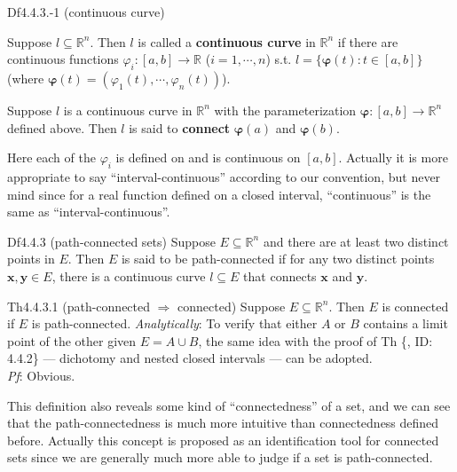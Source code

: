 \documentclass{article}
\begin{document}
\begin{Df}{Df4.4.3.-1 (continuous curve)}
    \begin{compactenum}
        \item Suppose $l\subseteq\mathbb{R}^n$. Then $l$ is called a \textbf{continuous curve} in $\mathbb{R}^n$ if there are continuous functions $\varphi_i: [a,b]\rightarrow\mathbb{R}$ ($i = 1, \cdots, n$) s.t. $l = \{\pmb{\varphi}(t): t\in [a,b]\}$ (where $\pmb{\varphi}(t) = (\varphi_1(t), \cdots, \varphi_n(t))$).
        \item Suppose $l$ is a continuous curve in $\mathbb{R}^n$ with the parameterization $\pmb{\varphi}: [a,b]\rightarrow\mathbb{R}^n$ defined above. Then $l$ is said to \textbf{connect} $\pmb{\varphi}(a)$ and $\pmb{\varphi}(b)$.
    \end{compactenum}
\end{Df}

\begin{Rmk}{}
    Here each of the $\varphi_i$ is defined on and is continuous on $[a,b]$. Actually it is more appropriate to say ``interval-continuous'' according to our convention, but never mind since for a real function defined on a closed interval, ``continuous'' is the same as ``interval-continuous''.
\end{Rmk}

\begin{Df}{Df4.4.3 (path-connected sets)}
    Suppose $E\subseteq\mathbb{R}^n$ and there are at least two distinct points in $E$. Then $E$ is said to be path-connected if for any two distinct points $\pmb{x}, \pmb{y}\in E$, there is a continuous curve $l\subseteq E$ that connects $\pmb{x}$ and $\pmb{y}$.
\end{Df}

\begin{Th}{Th4.4.3.1 (path-connected $\Rightarrow$ connected)}
    Suppose $E\subseteq\mathbb{R}^n$. Then $E$ is connected if $E$ is path-connected.
    \tcblower
    \textcolor{P}{\textit{Analytically}: To verify that either $A$ or $B$ contains a limit point of the other given $E = A\cup B$, the same idea with the proof of Th \{, ID: 4.4.2\} — dichotomy and nested closed intervals — can be adopted.}\\
    \textit{Pf}: Obvious.
\end{Th}

\begin{Rmk}{}
    This definition also reveals some kind of ``connectedness'' of a set, and we can see that the path-connectedness is much more intuitive than connectedness defined before. Actually this concept is proposed as an identification tool for connected sets since we are generally much more able to judge if a set is path-connected.
\end{Rmk}
\end{document}
